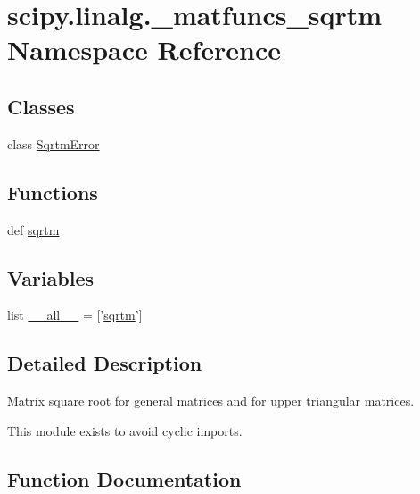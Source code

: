 \hypertarget{namespacescipy_1_1linalg_1_1__matfuncs__sqrtm}{}\section{scipy.\+linalg.\+\_\+matfuncs\+\_\+sqrtm Namespace Reference}
\label{namespacescipy_1_1linalg_1_1__matfuncs__sqrtm}
\subsection*{Classes}
\begin{DoxyCompactItemize}
\item 
class \hyperlink{classscipy_1_1linalg_1_1__matfuncs__sqrtm_1_1SqrtmError}{Sqrtm\+Error}
\end{DoxyCompactItemize}
\subsection*{Functions}
\begin{DoxyCompactItemize}
\item 
def \hyperlink{namespacescipy_1_1linalg_1_1__matfuncs__sqrtm_a07604a1c939dcafdf12de48369b08f3d}{sqrtm}
\end{DoxyCompactItemize}
\subsection*{Variables}
\begin{DoxyCompactItemize}
\item 
list \hyperlink{namespacescipy_1_1linalg_1_1__matfuncs__sqrtm_a96808e5a2c80d1bdbbca7f28b0b90e2c}{\+\_\+\+\_\+all\+\_\+\+\_\+} = \mbox{[}'\hyperlink{namespacescipy_1_1linalg_1_1__matfuncs__sqrtm_a07604a1c939dcafdf12de48369b08f3d}{sqrtm}'\mbox{]}
\end{DoxyCompactItemize}


\subsection{Detailed Description}
\begin{DoxyVerb}Matrix square root for general matrices and for upper triangular matrices.

This module exists to avoid cyclic imports.\end{DoxyVerb}
 

\subsection{Function Documentation}
\hypertarget{namespacescipy_1_1linalg_1_1__matfuncs__sqrtm_a07604a1c939dcafdf12de48369b08f3d}{}
